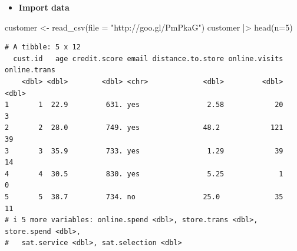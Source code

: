 \documentclass[
  ignorenonframetext,
]{beamer}
\newenvironment{Shaded}{\begin{snugshade}}{\end{snugshade}}
\newcommand{\AttributeTok}[1]{\textcolor[rgb]{0.40,0.45,0.13}{#1}}
\newcommand{\DecValTok}[1]{\textcolor[rgb]{0.68,0.00,0.00}{#1}}
\newcommand{\FunctionTok}[1]{\textcolor[rgb]{0.28,0.35,0.67}{#1}}
\newcommand{\NormalTok}[1]{\textcolor[rgb]{0.00,0.23,0.31}{#1}}
\newcommand{\OtherTok}[1]{\textcolor[rgb]{0.00,0.23,0.31}{#1}}
\newcommand{\SpecialCharTok}[1]{\textcolor[rgb]{0.37,0.37,0.37}{#1}}
\newcommand{\StringTok}[1]{\textcolor[rgb]{0.13,0.47,0.30}{#1}}
\providecommand{\tightlist}{%
  \setlength{\itemsep}{0pt}\setlength{\parskip}{0pt}}\usepackage{longtable,booktabs,array}
\begin{document}
\begin{frame}[fragile]{}
\label{section-4}
\begin{itemize}
\tightlist
\item
  \textbf{Import data}
\end{itemize}

\tiny

\begin{Shaded}
\begin{Highlighting}[]
\NormalTok{customer }\OtherTok{\textless{}{-}} \FunctionTok{read\_csv}\NormalTok{(}\AttributeTok{file =} \StringTok{"http://goo.gl/PmPkaG"}\NormalTok{)}
\NormalTok{customer }\SpecialCharTok{|\textgreater{}} \FunctionTok{head}\NormalTok{(}\AttributeTok{n=}\DecValTok{5}\NormalTok{)}
\end{Highlighting}
\end{Shaded}

\begin{verbatim}
# A tibble: 5 x 12
  cust.id   age credit.score email distance.to.store online.visits online.trans
    <dbl> <dbl>        <dbl> <chr>             <dbl>         <dbl>        <dbl>
1       1  22.9         631. yes                2.58            20            3
2       2  28.0         749. yes               48.2            121           39
3       3  35.9         733. yes                1.29            39           14
4       4  30.5         830. yes                5.25             1            0
5       5  38.7         734. no                25.0             35           11
# i 5 more variables: online.spend <dbl>, store.trans <dbl>, store.spend <dbl>,
#   sat.service <dbl>, sat.selection <dbl>
\end{verbatim}
\end{frame}
\end{document}
